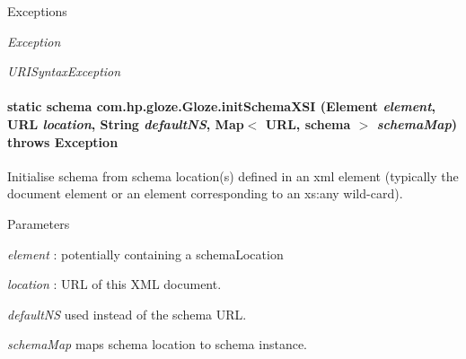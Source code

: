 \begin{DoxyExceptions}{Exceptions}
\item[{\em Exception}]\item[{\em URISyntaxException}]\end{DoxyExceptions}
\hypertarget{classcom_1_1hp_1_1gloze_1_1_gloze_a58ae2633f0436da4c607a6571a2faa81}{
\paragraph[{initSchemaXSI}]{\setlength{\rightskip}{0pt plus 5cm}static schema com.hp.gloze.Gloze.initSchemaXSI (Element {\em element}, \/  URL {\em location}, \/  String {\em defaultNS}, \/  Map$<$ URL, schema $>$ {\em schemaMap})  throws Exception }\hfill}
\label{classcom_1_1hp_1_1gloze_1_1_gloze_a58ae2633f0436da4c607a6571a2faa81}
Initialise schema from schema location(s) defined in an xml element (typically the document element or an element corresponding to an xs:any wild-\/card). 
\begin{DoxyParams}{Parameters}
\item[{\em element}]: potentially containing a schemaLocation \item[{\em location}]: URL of this XML document. \item[{\em defaultNS}]used instead of the schema URL. \item[{\em schemaMap}]maps schema location to schema instance. \end{DoxyParams}

